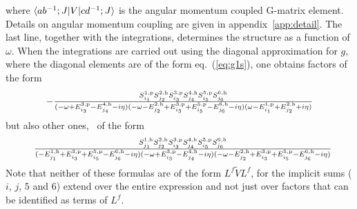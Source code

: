 %
where
$\ME< a b^{-1};J | V | c d^{-1};J >$ is the angular momentum coupled
G-matrix element. Details on angular momentum coupling are given in 
appendix~\ref{app:detail}.
The last line, together with the integrations, determines the structure 
as a function of $\omega$. When the integrations are
carried out using the diagonal approximation for $g$, where the diagonal
elements are of the  form eq.~(\ref{eq:g1s}),
one obtains factors of the form
%
	\begin{equation}
	-{\mbox{$\frac{{S^{1,{\rm p}}_{i_{1}} S^{2,{\rm h}}_{j_{2}} S^{3,{\rm p}}_{i_{3}} S^{4,{\rm h}}_{j_{4}} S^{5,{\rm p}}_{i_{5}} S^{6,{\rm h}}_{j_{6}}}}{{ (
		- \omega
		+ E^{3,{\rm p}}_{i_{3}} - E^{4,{\rm h}}_{j_{4}} 
		-i \eta 
	)
	(
		- \omega
		- E^{2,{\rm h}}_{j_{2}} + E^{3,{\rm p}}_{i_{3}} + E^{5,{\rm p}}_{i_{5}} - E^{6,{\rm h}}_{j_{6}} 
		-i \eta 
	)
	(
		 \omega
		- E^{1,{\rm p}}_{i_{1}} + E^{2,{\rm h}}_{j_{2}} 
		+ i \eta 
	)
	}}$}}
	\label{eq:L2Upper} 
	\end{equation}
%
but also other ones, \eg\ of the form
%
	\begin{equation}
	\hspace{-1pt}
	{\mbox{$\frac{{S^{1,{\rm h}}_{j_{1}} S^{2,{\rm h}}_{j_{2}} S^{3,{\rm p}}_{i_{3}} S^{4,{\rm h}}_{j_{4}} S^{5,{\rm p}}_{i_{5}} S^{6,{\rm h}}_{j_{6}}}}{{(
		- E^{1,{\rm h}}_{j_{1}} + E^{3,{\rm p}}_{i_{3}} + E^{5,{\rm p}}_{i_{5}} - E^{6,{\rm h}}_{j_{6}}
		-i \eta 
	)
	(
		- \omega
		+ E^{3,{\rm p}}_{i_{3}} - E^{4,{\rm h}}_{j_{4}} 
		-i \eta 
	)
	(
		- \omega
		- E^{2,{\rm h}}_{j_{2}} + E^{3,{\rm p}}_{i_{3}} + E^{5,{\rm p}}_{i_{5}} - E^{6,{\rm h}}_{j_{6}} 
		-i \eta 
	)
	}}$}}
	\hspace{-8pt}
	\label{eq:L2Lower}
	\end{equation}
%
Note that neither of these formulas
are of the form $L^f \tilde{V} L^f$, for the implicit sums 
($i$, $j$, $5$ and $6$) extend
over the entire expression and not just over factors that can be identified
as terms of $L^f$. 

